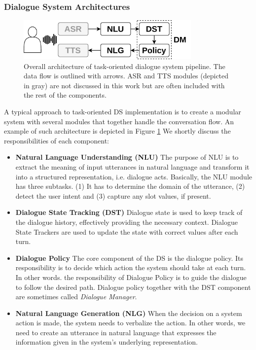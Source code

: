 \subsubsection{Dialogue System Architectures}
\begin{figure}[t]
    \centering
    \includegraphics[width=0.80\textwidth]{images/pipeline.png}
    \caption{Overall architecture of task-oriented dialogue system pipeline. The data flow is outlined with arrows. ASR and TTS modules (depicted in gray) are not discussed in this work but are often included with the rest of the components.}
    \label{fig:overall}
\end{figure}
A typical approach to task-oriented DS implementation is to create a modular system with several modules that together handle the conversation flow.
An example of such architecture is depicted in Figure \ref{fig:overall}
We shortly discuss the responsibilities of each component:
\begin{itemize}
    \item \textbf{Natural Language Understanding (NLU)} The purpose of NLU is to extract the meaning of input utterances in natural language and transform it into a structured representation, i.e. dialogue acts.
    Basically, the NLU module has three subtasks.
    (1) It has to determine the domain of the utterance, (2) detect the user intent and (3) capture any slot values, if present.
    \item \textbf{Dialogue State Tracking (DST)} Dialogue state is used to keep track of the dialogue history, effectively providing the necessary context.
    Dialogue State Trackers are used to update the state with correct values after each turn.
    \item \textbf{Dialogue Policy} The core component of the DS is the dialogue policy.
    Its responsibility is to decide which action the system should take at each turn.
    In other words. the responsibility of Dialogue Policy is to guide the dialogue to follow the desired path.
    Dialogue policy together with the DST component are sometimes called \emph{Dialogue Manager}.
    \item \textbf{Natural Language Generation (NLG)} When the decision on a system action is made, the system needs to verbalize the action.
    In other words, we need to create an utterance in natural language that expresses the information given in the system's underlying representation.
\end{itemize}

